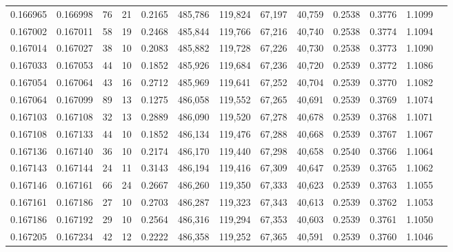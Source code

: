 \begin{tabular}{rrrrrrrrrrrrr}
0.166965 & 0.166998 &    76 &  21 &                                     0.2165 & 485,786 & 119,824 &  67,197 &  40,759 & 0.2538 & 0.3776 & 1.1099 \\
0.167002 & 0.167011 &    58 &  19 &                                     0.2468 & 485,844 & 119,766 &  67,216 &  40,740 & 0.2538 & 0.3774 & 1.1094 \\
0.167014 & 0.167027 &    38 &  10 &                                     0.2083 & 485,882 & 119,728 &  67,226 &  40,730 & 0.2538 & 0.3773 & 1.1090 \\
0.167033 & 0.167053 &    44 &  10 &                                     0.1852 & 485,926 & 119,684 &  67,236 &  40,720 & 0.2539 & 0.3772 & 1.1086 \\
0.167054 & 0.167064 &    43 &  16 &                                     0.2712 & 485,969 & 119,641 &  67,252 &  40,704 & 0.2539 & 0.3770 & 1.1082 \\
0.167064 & 0.167099 &    89 &  13 &                                     0.1275 & 486,058 & 119,552 &  67,265 &  40,691 & 0.2539 & 0.3769 & 1.1074 \\
0.167103 & 0.167108 &    32 &  13 &                                     0.2889 & 486,090 & 119,520 &  67,278 &  40,678 & 0.2539 & 0.3768 & 1.1071 \\
0.167108 & 0.167133 &    44 &  10 &                                     0.1852 & 486,134 & 119,476 &  67,288 &  40,668 & 0.2539 & 0.3767 & 1.1067 \\
0.167136 & 0.167140 &    36 &  10 &                                     0.2174 & 486,170 & 119,440 &  67,298 &  40,658 & 0.2540 & 0.3766 & 1.1064 \\
0.167143 & 0.167144 &    24 &  11 &                                     0.3143 & 486,194 & 119,416 &  67,309 &  40,647 & 0.2539 & 0.3765 & 1.1062 \\
0.167146 & 0.167161 &    66 &  24 &                                     0.2667 & 486,260 & 119,350 &  67,333 &  40,623 & 0.2539 & 0.3763 & 1.1055 \\
0.167161 & 0.167186 &    27 &  10 &                                     0.2703 & 486,287 & 119,323 &  67,343 &  40,613 & 0.2539 & 0.3762 & 1.1053 \\
0.167186 & 0.167192 &    29 &  10 &                                     0.2564 & 486,316 & 119,294 &  67,353 &  40,603 & 0.2539 & 0.3761 & 1.1050 \\
0.167205 & 0.167234 &    42 &  12 &                                     0.2222 & 486,358 & 119,252 &  67,365 &  40,591 & 0.2539 & 0.3760 & 1.1046 \\

\end{tabular}
